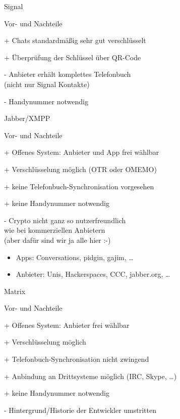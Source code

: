 \begin{frame}{Signal}
\begin{blex}{Vor- und Nachteile}
\item[+] Chats standardmäßig sehr gut verschlüsselt
\item[+] Überprüfung der Schlüssel über QR-Code
\item[-] Anbieter erhält komplettes Telefonbuch\\ (nicht nur Signal Kontakte)
\item[-] Handynummer notwendig
\end{blex}
\end{frame}

\begin{frame}{Jabber/XMPP}
\begin{blex}{Vor- und Nachteile}
\item[+] Offenes System: Anbieter und App frei wählbar
\item[+] Verschlüsselung möglich (OTR oder OMEMO)
\item[+] keine Telefonbuch-Synchronisation vorgesehen
\item[+] keine Handynummer notwendig
\item[-] Crypto nicht ganz so nutzerfreundlich\\wie bei kommerziellen Anbietern\\(aber dafür sind wir ja alle hier :-)
\end{blex}
\begin{itemize}
  \item    Apps: Conversations, pidgin, gajim, \ldots
  \item    Anbieter: Unis, Hackerspaces, CCC, jabber.org, \ldots
\end{itemize}
\end{frame}

\begin{frame}{Matrix}
\begin{blex}{Vor- und Nachteile}
\item[+] Offenes System: Anbieter frei wählbar
\item[+] Verschlüsselung möglich
\item[+] Telefonbuch-Synchronisation nicht zwingend
\item[+] Anbindung an Drittsysteme möglich (IRC, Skype, \ldots)
\item[+] keine Handynummer notwendig
\item[-] Hintergrund/Historie der Entwickler umstritten
\end{blex}
\end{frame}

